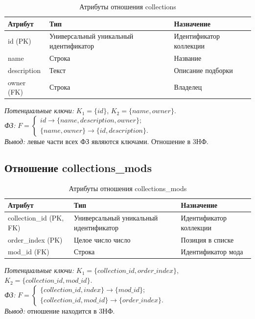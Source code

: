 \begin{table}[H]
	\centering
	\caption{Атрибуты отношения collections}
	\label{tab:collections}
	\begin{tabularx}{\textwidth}{|l|X|X|}
		\hline
		\textbf{Атрибут} & \textbf{Тип} & \textbf{Назначение} \\
		\hline
		id (PK) & Универсальный уникальный идентификатор & Идентификатор коллекции \\
		\hline
		name & Строка & Название \\
		\hline
		description & Текст & Описание подборки \\
		\hline
		owner (FK) & Строка & Владелец \\
		\hline
	\end{tabularx}
\end{table}

\textit{Потенциальные ключи:} $K_1 = \{id\}$, $K_2 = \{name, owner\}$. \\
\textit{ФЗ:} $F = \left\{ \begin{array}{l}
	id \rightarrow \{name, description, owner\}; \\
	\{name, owner\} \rightarrow \{id, description\}.
\end{array} \right.$ \\
\textit{Вывод:} левые части всех ФЗ являются ключами. Отношение в 3НФ.

\subsection*{Отношение collections\_mods}

\begin{table}[H]
	\centering
	\caption{Атрибуты отношения collections\_mods}
	\label{tab:collections_mods}
	\begin{tabularx}{\textwidth}{|l|X|l|}
		\hline
		\textbf{Атрибут} & \textbf{Тип} & \textbf{Назначение} \\
		\hline
		collection\_id (PK, FK)& Универсальный уникальный идентификатор & Идентификатор коллекции \\
		\hline
		order\_index (PK) & Целое число число & Позиция в списке \\
		\hline
		mod\_id (FK) & Строка & Идентификатор мода \\
		\hline
	\end{tabularx}
\end{table}

\textit{Потенциальные ключи:} $K_1 = \{collection\_id, order\_index\}$, \\$K_2 = \{collection\_id, mod\_id\}$. \\
\textit{ФЗ:} $F = \left\{ \begin{array}{l}
	\{collection\_id, index\} \rightarrow \{mod\_id\}; \\
	\{collection\_id, mod\_id\} \rightarrow \{order\_index\}.
\end{array} \right.$ \\
\textit{Вывод:} отношение находится в 3НФ.

